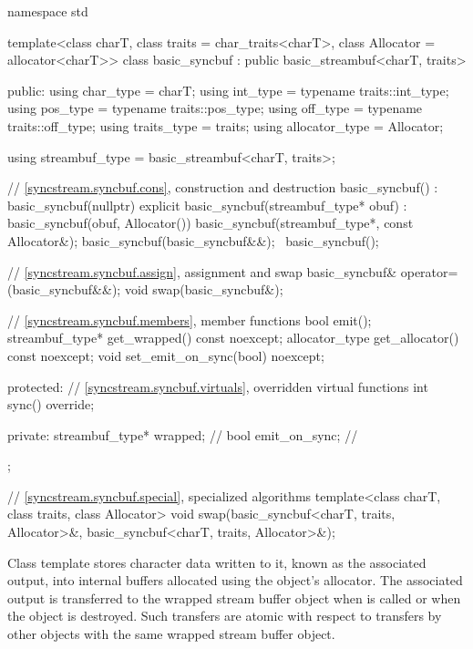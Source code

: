 %
\begin{codeblock}
namespace std {
  template<class charT, class traits = char_traits<charT>, class Allocator = allocator<charT>>
  class basic_syncbuf : public basic_streambuf<charT, traits> {
  public:
    using char_type      = charT;
    using int_type       = typename traits::int_type;
    using pos_type       = typename traits::pos_type;
    using off_type       = typename traits::off_type;
    using traits_type    = traits;
    using allocator_type = Allocator;

    using streambuf_type = basic_streambuf<charT, traits>;

    // \ref{syncstream.syncbuf.cons}, construction and destruction
    basic_syncbuf()
      : basic_syncbuf(nullptr) {}
    explicit basic_syncbuf(streambuf_type* obuf)
      : basic_syncbuf(obuf, Allocator()) {}
    basic_syncbuf(streambuf_type*, const Allocator&);
    basic_syncbuf(basic_syncbuf&&);
    ~basic_syncbuf();

    // \ref{syncstream.syncbuf.assign}, assignment and swap
    basic_syncbuf& operator=(basic_syncbuf&&);
    void swap(basic_syncbuf&);

    // \ref{syncstream.syncbuf.members}, member functions
    bool emit();
    streambuf_type* get_wrapped() const noexcept;
    allocator_type get_allocator() const noexcept;
    void set_emit_on_sync(bool) noexcept;

  protected:
    // \ref{syncstream.syncbuf.virtuals}, overridden virtual functions
    int sync() override;

  private:
    streambuf_type* wrapped;    // \expos
    bool emit_on_sync{};        // \expos
  };

  // \ref{syncstream.syncbuf.special}, specialized algorithms
  template<class charT, class traits, class Allocator>
    void swap(basic_syncbuf<charT, traits, Allocator>&,
              basic_syncbuf<charT, traits, Allocator>&);
}
\end{codeblock}

\pnum
Class template  stores character data
written to it, known as the associated output, into internal
buffers allocated using the object's allocator.
The associated output is transferred to the
wrapped stream buffer object 
when  is called
or when the  object is destroyed.
Such transfers are atomic with respect to transfers
by other  objects
with the same wrapped stream buffer object.

